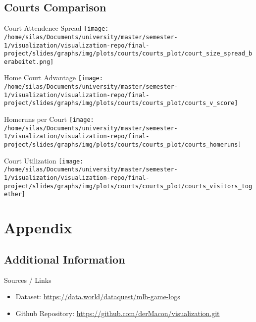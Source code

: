 \documentclass[pdf]{beamer}
\begin{document}
    \subsection{Courts Comparison}
    \begin{frame}{Court Attendence Spread}
        \centering
        \texttt{[image: /home/silas/Documents/university/master/semester-1/visualization/visualization-repo/final-project/slides/graphs/img/plots/courts/courts\_plot/court\_size\_spread\_berabeitet.png]}
    \end{frame}
    \begin{frame}{Home Court Advantage}
        \centering
        \texttt{[image: /home/silas/Documents/university/master/semester-1/visualization/visualization-repo/final-project/slides/graphs/img/plots/courts/courts\_plot/courts\_v\_score]}
    \end{frame}
    \begin{frame}{Homeruns per Court}
        \centering
        \texttt{[image: /home/silas/Documents/university/master/semester-1/visualization/visualization-repo/final-project/slides/graphs/img/plots/courts/courts\_plot/courts\_homeruns]}
    \end{frame}
    \begin{frame}{Court Utilization}
        \centering
        \texttt{[image: /home/silas/Documents/university/master/semester-1/visualization/visualization-repo/final-project/slides/graphs/img/plots/courts/courts\_plot/courts\_visitors\_together]}
    \end{frame}


    \section{Appendix}

    \subsection{Additional Information}
    \begin{frame}{Sources / Links}
        \begin{itemize}
            \item Dataset: \href{https://data.world/dataquest/mlb-game-logs}{https://data.world/dataquest/mlb-game-logs}
            \item Github Repository: \href{https://github.com/derMacon/visualization.git}{https://github.com/derMacon/visualization.git}
        \end{itemize}
    \end{frame}
\end{document}
